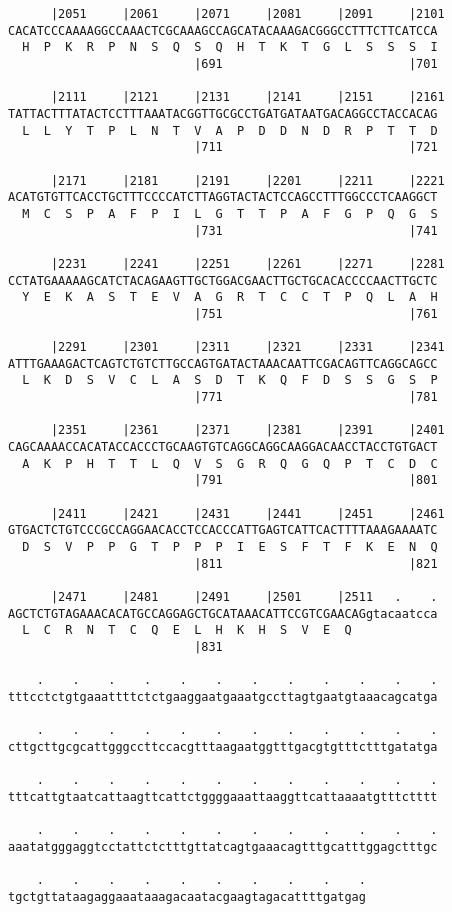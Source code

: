 \documentclass{article}
\begin{document}
\begin{Verbatim}
      |2051     |2061     |2071     |2081     |2091     |2101
CACATCCCAAAAGGCCAAACTCGCAAAGCCAGCATACAAAGACGGGCCTTTCTTCATCCA
  H  P  K  R  P  N  S  Q  S  Q  H  T  K  T  G  L  S  S  S  I
                          |691                          |701
  
      |2111     |2121     |2131     |2141     |2151     |2161
TATTACTTTATACTCCTTTAAATACGGTTGCGCCTGATGATAATGACAGGCCTACCACAG
  L  L  Y  T  P  L  N  T  V  A  P  D  D  N  D  R  P  T  T  D
                          |711                          |721
  
      |2171     |2181     |2191     |2201     |2211     |2221
ACATGTGTTCACCTGCTTTCCCCATCTTAGGTACTACTCCAGCCTTTGGCCCTCAAGGCT
  M  C  S  P  A  F  P  I  L  G  T  T  P  A  F  G  P  Q  G  S
                          |731                          |741
  
      |2231     |2241     |2251     |2261     |2271     |2281
CCTATGAAAAAGCATCTACAGAAGTTGCTGGACGAACTTGCTGCACACCCCAACTTGCTC
  Y  E  K  A  S  T  E  V  A  G  R  T  C  C  T  P  Q  L  A  H
                          |751                          |761
  
      |2291     |2301     |2311     |2321     |2331     |2341
ATTTGAAAGACTCAGTCTGTCTTGCCAGTGATACTAAACAATTCGACAGTTCAGGCAGCC
  L  K  D  S  V  C  L  A  S  D  T  K  Q  F  D  S  S  G  S  P
                          |771                          |781
  
      |2351     |2361     |2371     |2381     |2391     |2401
CAGCAAAACCACATACCACCCTGCAAGTGTCAGGCAGGCAAGGACAACCTACCTGTGACT
  A  K  P  H  T  T  L  Q  V  S  G  R  Q  G  Q  P  T  C  D  C
                          |791                          |801
  
      |2411     |2421     |2431     |2441     |2451     |2461
GTGACTCTGTCCCGCCAGGAACACCTCCACCCATTGAGTCATTCACTTTTAAAGAAAATC
  D  S  V  P  P  G  T  P  P  P  I  E  S  F  T  F  K  E  N  Q
                          |811                          |821
  
      |2471     |2481     |2491     |2501     |2511   .    .
AGCTCTGTAGAAACACATGCCAGGAGCTGCATAAACATTCCGTCGAACAGgtacaatcca
  L  C  R  N  T  C  Q  E  L  H  K  H  S  V  E  Q            
                          |831                              
  
    .    .    .    .    .    .    .    .    .    .    .    .
tttcctctgtgaaattttctctgaaggaatgaaatgccttagtgaatgtaaacagcatga
  
    .    .    .    .    .    .    .    .    .    .    .    .
cttgcttgcgcattgggccttccacgtttaagaatggtttgacgtgtttctttgatatga
  
    .    .    .    .    .    .    .    .    .    .    .    .
tttcattgtaatcattaagttcattctggggaaattaaggttcattaaaatgtttctttt
  
    .    .    .    .    .    .    .    .    .    .    .    .
aaatatgggaggtcctattctctttgttatcagtgaaacagtttgcatttggagctttgc
  
    .    .    .    .    .    .    .    .    .    .
tgctgttataagaggaaataaagacaatacgaagtagacattttgatgag
\end{Verbatim}
\end{document}

